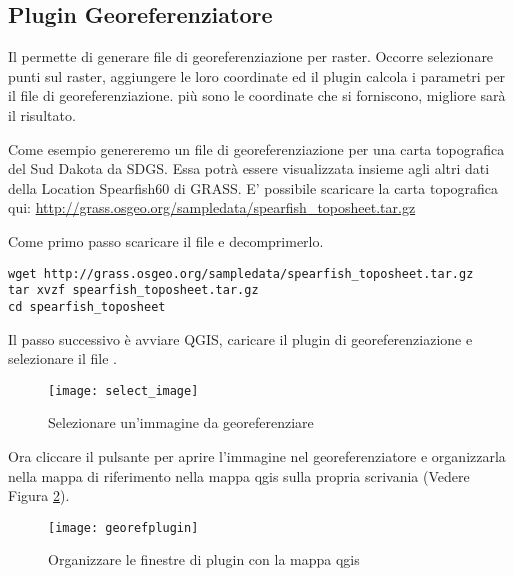 
\subsection{Plugin Georeferenziatore}


Il  permette di generare file di georeferenziazione per raster. Occorre selezionare punti sul raster, aggiungere le loro coordinate ed il plugin calcola i parametri per il file di georeferenziazione. più sono le coordinate che si forniscono, migliore sarà il risultato.

Come esempio genereremo un file di georeferenziazione per una carta topografica del Sud Dakota da SDGS. Essa potrà essere visualizzata insieme agli altri dati della Location Spearfish60 di GRASS. E' possibile scaricare la carta topografica qui: \url{http://grass.osgeo.org/sampledata/spearfish\_toposheet.tar.gz}

Come primo passo scaricare il file e decomprimerlo.

\begin{verbatim}
wget http://grass.osgeo.org/sampledata/spearfish_toposheet.tar.gz
tar xvzf spearfish_toposheet.tar.gz
cd spearfish_toposheet
\end{verbatim}

Il passo successivo è avviare QGIS, caricare il plugin di georeferenziazione e selezionare il file .

\begin{figure}[ht]
\begin{center}
\caption{Selezionare un'immagine da georeferenziare \nixcaption}\label{fig:select_image}\smallskip
  \texttt{[image: select\_image]}
\end{center}
\end{figure}

Ora cliccare il pulsante  per aprire l'immagine nel georeferenziatore e organizzarla nella mappa di riferimento nella mappa qgis sulla propria scrivania (Vedere Figura \ref{fig:georefplugin}).

\begin{figure}[ht]
\begin{center}
  \caption{Organizzare le finestre di plugin con la mappa qgis \nixcaption}\label{fig:georefplugin}\smallskip
  \texttt{[image: georefplugin]}
\end{center}
\end{figure}

